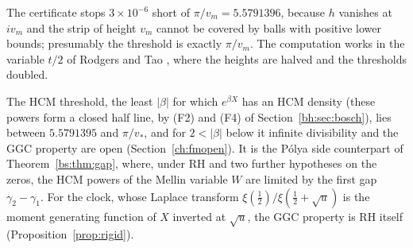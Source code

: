 The certificate stops $3\times10^{-6}$ short of $\pi/v_m=5.5791396$, because $h$ vanishes at $iv_m$ and the strip of height $v_m$ cannot be covered by balls with positive lower bounds; presumably the threshold is exactly $\pi/v_m$. The computation works in the variable $t/2$ of Rodgers and Tao \cite{RodgersTao}, where the heights are halved and the thresholds doubled.

The HCM threshold, the least $|\beta|$ for which $e^{\beta X}$ has an HCM density (these powers form a closed half line, by (F2) and (F4) of Section~\ref{bh:sec:bosch}), lies between $5.5791395$ and $\pi/v_*$, and for $2<|\beta|$ below it infinite divisibility and the GGC property are open (Section~\ref{ch:fmopen}). It is the P\'olya side counterpart of Theorem~\ref{bs:thm:gap}, where, under RH and two further hypotheses on the zeros, the HCM powers of the Mellin variable $W$ are limited by the first gap $\gamma_2-\gamma_1$. For the clock, whose Laplace transform $\xi(\frac12)/\xi(\frac12+\sqrt u)$ is the moment generating function of $X$ inverted at $\sqrt u$, the GGC property is RH itself (Proposition~\ref{prop:rigid}).
